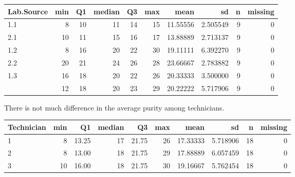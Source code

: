 \documentclass[12pt,]{article}
\begin{document}
\begin{table}[H]
\centering\begingroup\fontsize{8}{10}\selectfont

\begin{tabular}{lrrrrr>{\columncolor[HTML]{EAFAF1}}rrrr}
\toprule
Lab.Source & min & Q1 & median & Q3 & max & mean & sd & n & missing\\
\midrule
1.1 & 8 & 10 & 11 & 14 & 15 & 11.55556 & 2.505549 & 9 & 0\\
2.1 & 10 & 11 & 15 & 16 & 17 & 13.88889 & 2.713137 & 9 & 0\\
1.2 & 8 & 16 & 20 & 22 & 30 & 19.11111 & 6.392270 & 9 & 0\\
2.2 & 20 & 21 & 24 & 26 & 28 & 23.66667 & 2.783882 & 9 & 0\\
1.3 & 16 & 18 & 20 & 22 & 26 & 20.33333 & 3.500000 & 9 & 0\\
\addlinespace
2.3 & 12 & 18 & 20 & 23 & 29 & 20.22222 & 5.717906 & 9 & 0\\
\bottomrule
\end{tabular}
\endgroup{}
\end{table}

There is not much difference in the average purity among technicians.

\begin{table}[H]
\centering\begingroup\fontsize{8}{10}\selectfont

\begin{tabular}{lrrrrr>{\columncolor[HTML]{EAFAF1}}rrrr}
\toprule
Technician & min & Q1 & median & Q3 & max & mean & sd & n & missing\\
\midrule
1 & 8 & 13.25 & 17 & 21.75 & 26 & 17.33333 & 5.718906 & 18 & 0\\
2 & 8 & 13.00 & 18 & 21.75 & 29 & 17.88889 & 6.057459 & 18 & 0\\
3 & 10 & 16.00 & 18 & 21.75 & 30 & 19.16667 & 5.762454 & 18 & 0\\
\bottomrule
\end{tabular}
\endgroup{}
\end{table}
\end{document}
